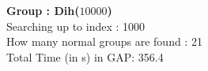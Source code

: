 \textbf{Group : Dih($10000$)}\\
Searching up to index : 1000\\
How many normal groups are found : 21\\
Total Time (in s) in GAP: 356.4\\
